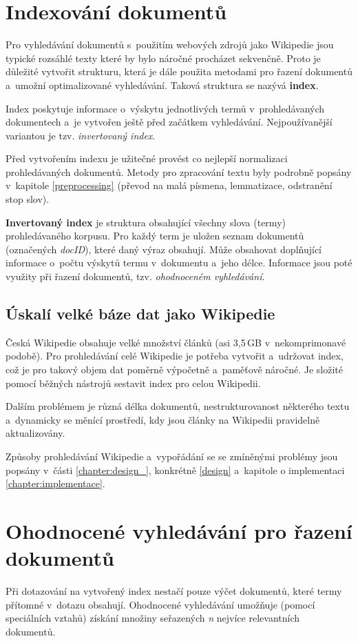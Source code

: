 \section{Indexování dokumentů}
Pro vyhledávání dokumentů s~použitím webových zdrojů jako Wikipedie jsou typické rozsáhlé texty které by bylo náročné procházet sekvenčně. Proto je důležité vytvořit strukturu, která je dále použita metodami pro řazení dokumentů a~umožní optimalizované vyhledávání. Taková struktura se nazývá \textbf{index}.\par
Index poskytuje informace o~výskytu jednotlivých termů v~prohledávaných dokumentech a~je vytvořen ještě před začátkem vyhledávání. Nejpoužívanější variantou je tzv. \emph{invertovaný index}.\par
Před vytvořením indexu je užitečné provést co nejlepší normalizaci prohledávaných dokumentů. Metody pro zpracování textu byly podrobně popsány v~kapitole \ref{preprocessing} (převod na malá písmena, lemmatizace, odstranění stop slov).\par
\textbf{Invertovaný index} je struktura obsahující všechny slova (termy) prohledávaného korpusu. Pro každý term je uložen seznam dokumentů (označených \emph{docID}), které daný výraz obsahují. Může obsahovat doplňující informace o~počtu výskytů termu v~dokumentu a~jeho délce. Informace jsou poté využity při řazení dokumentů, tzv. \emph{ohodnoceném vyhledávání}.

\subsection{Úskalí velké báze dat jako Wikipedie}
Česká Wikipedie obsahuje velké množství článků (asi 3,5\,GB v~nekomprimonavé podobě). Pro prohledávání celé Wikipedie je potřeba vytvořit a~udržovat index, což je pro takový objem dat poměrně výpočetně a~paměťově náročné. Je složité pomocí běžných nástrojů sestavit index pro celou Wikipedii.\par
Dalším problémem je různá délka dokumentů, nestrukturovanost některého textu a~dynamicky se měnící prostředí, kdy jsou články na Wikipedii pravidelně aktualizovány.\par\enlargethispage{\baselineskip}
Způsoby prohledávání Wikipedie a~vypořádání se se zmíněnými problémy jsou popsány v~části \ref{chapter:design_}, konkrétně \ref{design} a~kapitole o implementaci \ref{chapter:implementace}.

\section{Ohodnocené vyhledávání pro řazení dokumentů}
Při dotazování na vytvořený index nestačí pouze výčet dokumentů, které termy přítomné v~dotazu obsahují. Ohodnocené vyhledávání umožňuje (pomocí speciálních vztahů) získání množiny seřazených \emph{n} nejvíce relevantních dokumentů.\par

